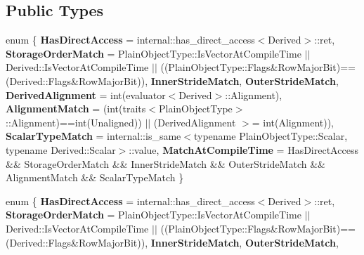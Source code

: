 \subsection*{Public Types}
\begin{DoxyCompactItemize}
\item 
\mbox{\label{struct_eigen_1_1internal_1_1traits_3_01_ref_3_01___plain_object_type_00_01___options_00_01___stride_type_01_4_01_4_1_1match_a2b01a9699c0dd06b6d8ddeb2dde5413b}} 
enum \{ \newline
{\bfseries Has\+Direct\+Access} = internal\+:\+:has\+\_\+direct\+\_\+access$<$Derived$>$\+:\+:ret, 
{\bfseries Storage\+Order\+Match} = Plain\+Object\+Type\+:\+:Is\+Vector\+At\+Compile\+Time $\vert$$\vert$ Derived\+:\+:Is\+Vector\+At\+Compile\+Time $\vert$$\vert$ ((Plain\+Object\+Type\+:\+:Flags\&Row\+Major\+Bit)==(Derived\+:\+:Flags\&Row\+Major\+Bit)), 
{\bfseries Inner\+Stride\+Match}, 
{\bfseries Outer\+Stride\+Match}, 
\newline
{\bfseries Derived\+Alignment} = int(evaluator$<$Derived$>$\+:\+:Alignment), 
{\bfseries Alignment\+Match} = (int(traits$<$Plain\+Object\+Type$>$\+:\+:Alignment)==int(Unaligned)) $\vert$$\vert$ (Derived\+Alignment $>$= int(Alignment)), 
{\bfseries Scalar\+Type\+Match} = internal\+:\+:is\+\_\+same$<$typename Plain\+Object\+Type\+:\+:Scalar, typename Derived\+:\+:Scalar$>$\+:\+:value, 
{\bfseries Match\+At\+Compile\+Time} = Has\+Direct\+Access \&\& Storage\+Order\+Match \&\& Inner\+Stride\+Match \&\& Outer\+Stride\+Match \&\& Alignment\+Match \&\& Scalar\+Type\+Match
 \}
\item 
\mbox{\label{struct_eigen_1_1internal_1_1traits_3_01_ref_3_01___plain_object_type_00_01___options_00_01___stride_type_01_4_01_4_1_1match_abadfba9cd9c64cd5b4cd77a7a9ba24a2}} 
enum \{ \newline
{\bfseries Has\+Direct\+Access} = internal\+:\+:has\+\_\+direct\+\_\+access$<$Derived$>$\+:\+:ret, 
{\bfseries Storage\+Order\+Match} = Plain\+Object\+Type\+:\+:Is\+Vector\+At\+Compile\+Time $\vert$$\vert$ Derived\+:\+:Is\+Vector\+At\+Compile\+Time $\vert$$\vert$ ((Plain\+Object\+Type\+:\+:Flags\&Row\+Major\+Bit)==(Derived\+:\+:Flags\&Row\+Major\+Bit)), 
{\bfseries Inner\+Stride\+Match}, 
{\bfseries Outer\+Stride\+Match}, 
$$
\end{DoxyCompactItemize}
